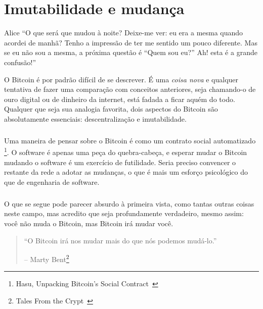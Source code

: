 \chapter{Imutabilidade e mudança}
\label{les:1}

\begin{chapquote}{Alice}
\enquote{O que será que mudou à noite? Deixe-me ver: eu era a mesma quando acordei de manhã? Tenho a impressão de ter me sentido um pouco diferente. Mas se eu não sou a mesma, a próxima questão é “Quem sou eu?” Ah! esta é a grande confusão!}
\end{chapquote}

O Bitcoin é por padrão difícil de se descrever. É uma \textit {coisa nova} e qualquer tentativa de fazer uma comparação com conceitos anteriores, seja chamando-o de ouro digital ou de dinheiro da internet, está fadada a ficar aquém do todo. Qualquer que seja sua analogia favorita, dois aspectos do Bitcoin são absolutamente essenciais: descentralização e imutabilidade.

\paragraph{}
Uma maneira de pensar sobre o Bitcoin é como um contrato social automatizado \footnote{Hasu, Unpacking Bitcoin's Social Contract~\cite{social-contract}}. O software é apenas uma peça do quebra-cabeça, e esperar mudar o Bitcoin mudando o software é um exercício de futilidade. Seria preciso convencer o restante da rede a adotar as mudanças, o que é mais um esforço psicológico do que de engenharia de software.

\paragraph{}
O que se segue pode parecer absurdo à primeira vista, como tantas outras coisas neste campo, mas acredito que seja profundamente verdadeiro, mesmo assim: você não muda o Bitcoin, mas Bitcoin irá mudar você.

\begin{quotation}\begin{samepage}
\enquote{O Bitcoin irá nos mudar mais do que nós podemos mudá-lo.}
\begin{flushright} -- Marty Bent\footnote{Tales From the Crypt~\cite{tftc21}}
\end{flushright}\end{samepage}\end{quotation}

